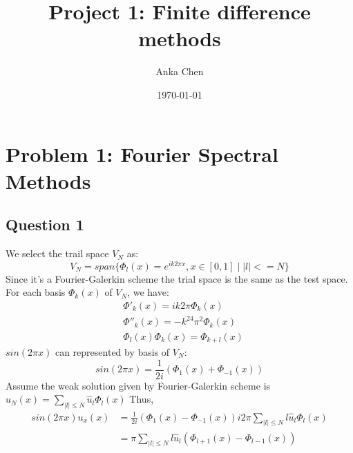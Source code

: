 \documentclass[12pt, fullpage,letterpaper]{article}
\title{Project 1: Finite difference methods}
\author{Anka Chen}
\date{\today}
\begin{document}
\maketitle

\section{Problem 1: Fourier Spectral Methods}
\subsection{Question 1}
We select the trail space $V_N$ as: 
\begin{equation}
    V_N=span\{\Phi_l(x)=e^{i k 2 \pi x},  x \in[0,1] \mid |l| <= N\}
\end{equation}
Since it's a Fourier-Galerkin scheme the trial space is the same as the test space.
For each basis $ \Phi_k(x)$ of $V_N$, we have:
\begin{align}
    & \Phi'_k(x) =  ik2\pi \Phi_k(x) \\
    & \Phi''_k(x) =  -k^24\pi^2 \Phi_k(x) \\ 
    & \Phi_l(x)\Phi_k(x) = \Phi_{k+l}(x)
\end{align}
$sin(2\pi x)$ can represented by basis of $V_N$:
\begin{equation}
    sin(2\pi x) = \frac{1}{2i} (\Phi_1(x) + \Phi_{-1}(x))
\end{equation}
Assume the weak solution given by Fourier-Galerkin scheme is $u_N(x) = \sum_{|l| \leq N} \hat{u}_l \Phi_l(x)$
Thus, 
\begin{align}
    sin(2\pi x) u_x(x) & = \frac{1}{2i} (\Phi_1(x) - \Phi_{-1}(x)) i2\pi \sum_{|l| \leq N} l \hat{u}_l  \Phi_l(x) \\
    &= \pi \sum_{|l| \leq N} l \hat{u}_l  (\Phi_{l+1}(x) - \Phi_{l-1}(x))
\end{align}
\end{document}
